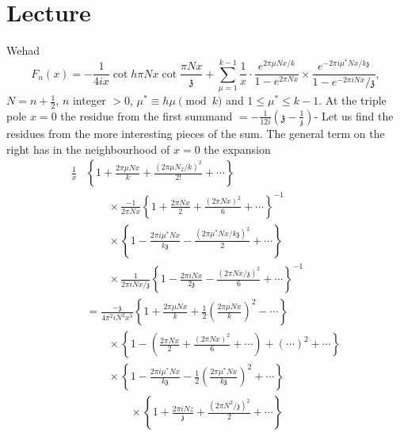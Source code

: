 \chapter{Lecture}\label{part3:lec28} %

We\pageoriginale had
$$
  F_n (x) =- \frac{1}{4 ix} \cot h \pi N x \cot \frac{ \pi N
    x}{\mathfrak{z}}
    + \sum^{k-1}_{\mu=1} \frac{1}{x} \cdot \frac{e^{2 \pi \mu N
        x/k}}{1- e^{2 \pi N x}} \times \frac{e^{- 2 \pi i \mu^*
        Nx/k\mathfrak{z}}}{1- e^{- 2 \pi i N x}/\mathfrak{z}},
$$
$N= n+ \frac{1}{2}$, $n$ integer $>0$, $\mu^* \equiv h \mu \pmod{k}$
    and $1\leq \mu^* \leq k-1$. At the triple pole $x=0$ the residue
    from the first summand $=- \frac{1}{12i} \left( \mathfrak{z}-
    \frac{1}{\mathfrak{z}} \right)$- Let us find the residues from the
    more interesting pieces of the sum. The general term on the right
    has in the neighbourhood of $x=0$ the expansion
\begin{align*}
  \frac{1}{x} & \left\{1+ \frac{2 \pi \mu N x}{k} + \frac{(2 \pi \mu
    N_2/k)^2}{2!} + \cdots \right\}\\ 
  & \qquad \times \frac{-1}{2 \pi Nx} 
  \left\{
  1+ \frac{2 \pi N x}{2} + \frac{(2 \pi N x)^2}{6} + \cdots
  \right\}^{-1}\\
  & \qquad \times \left\{1- \frac{2 \pi i \mu^* Nx}{k\mathfrak{z}}- \frac{(2
    \pi \mu^* Nx/k\mathfrak{z})^2}{2} + \cdots  \right\}\\
  &\qquad \times
  \frac{1}{2 \pi i N x /\mathfrak{z}} \left\{ 1- \frac{2 \pi i
    Nx}{2\mathfrak{z}} - \frac{(2 \pi N x/\mathfrak{z})^2}{6} + \cdots
  \right\}^{-1}\\
  & = \frac{- \mathfrak{z}}{4 \pi^2 i N^2 x^3} \left\{1+ \frac{2 \pi \mu
    Nx}{k} + \frac{1}{2} \left( \frac{2 \pi \mu N x}{k}\right)^2-
  \cdots \right\}\\
  & \qquad \times \left\{ 1- \left(\frac{2 \pi N x}{2} + \frac{(2 \pi N
    x)^2}{6}+ \cdots \right)+ (\cdots)^2 + \cdots \right\}\\
  & \qquad \times \left\{1- \frac{2 \pi i \mu^* Nx}{k\mathfrak{z}} - \frac{1}{2}
  \left( \frac{2 \pi \mu^* N x}{k\mathfrak{z}}\right)^2 + \cdots
  \right\}\\
  & \qquad \qquad \times \left\{1+ \frac{2 \pi i N z}{\mathfrak{z} } +
  \frac{(2 \pi N^2/\mathfrak{z})^2}{2}+ \cdots \right\}
\end{align*}\pageoriginale

